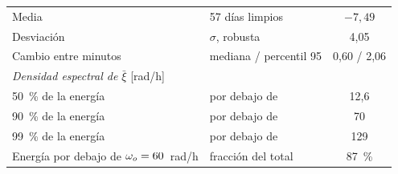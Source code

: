 \begin{table}[!htbp]
\begin{tabular}{llc}
Media & 57 días limpios & $-7{,}49$ \\
Desviación & $\sigma$, robusta & 4,05 \\
Cambio entre minutos & mediana / percentil 95 & 0,60 / 2,06 \\
\midrule
\multicolumn{3}{l}{\emph{Densidad espectral de $\bar{\xi}$} [rad/h]} \\
50~\% de la energía & por debajo de & 12,6 \\
90~\% de la energía & por debajo de & 70 \\
99~\% de la energía & por debajo de & 129 \\
Energía por debajo de $\omega_{o} = 60$~rad/h & fracción del total & 87~\% \\
\bottomrule
\end{tabular}
\end{table}
